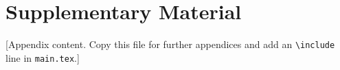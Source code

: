 \chapter{Supplementary Material}\label{app:a}

[Appendix content. Copy this file for further appendices and add an \texttt{\textbackslash include} line in \texttt{main.tex}.]
